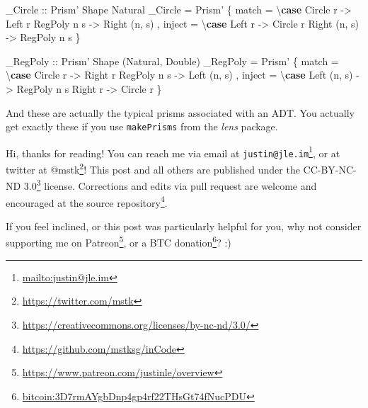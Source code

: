\documentclass[]{article}
\newenvironment{Shaded}{}{}
\newcommand{\DataTypeTok}[1]{\textcolor[rgb]{0.56,0.13,0.00}{#1}}
\newcommand{\FunctionTok}[1]{\textcolor[rgb]{0.02,0.16,0.49}{#1}}
\newcommand{\KeywordTok}[1]{\textcolor[rgb]{0.00,0.44,0.13}{\textbf{#1}}}
\newcommand{\NormalTok}[1]{#1}
\newcommand{\OtherTok}[1]{\textcolor[rgb]{0.00,0.44,0.13}{#1}}
\renewcommand{\href}[2]{#2\footnote{\url{#1}}}
\begin{document}
\begin{Shaded}
\begin{Highlighting}[]
\OtherTok{_Circle ::} \DataTypeTok{Prism'} \DataTypeTok{Shape} \DataTypeTok{Natural}
\NormalTok{_Circle }\FunctionTok{=} \DataTypeTok{Prism'}\NormalTok{ \{ match  }\FunctionTok{=}\NormalTok{ \textbackslash{}}\KeywordTok{case} \DataTypeTok{Circle}\NormalTok{  r    }\OtherTok{->} \DataTypeTok{Left}\NormalTok{ r}
                                  \DataTypeTok{RegPoly}\NormalTok{ n s  }\OtherTok{->} \DataTypeTok{Right}\NormalTok{ (n, s)}
\NormalTok{                 , inject }\FunctionTok{=}\NormalTok{ \textbackslash{}}\KeywordTok{case} \DataTypeTok{Left}\NormalTok{   r     }\OtherTok{->} \DataTypeTok{Circle}\NormalTok{ r}
                                  \DataTypeTok{Right}\NormalTok{ (n, s) }\OtherTok{->} \DataTypeTok{RegPoly}\NormalTok{ n s}
\NormalTok{                 \}}

\OtherTok{_RegPoly ::} \DataTypeTok{Prism'} \DataTypeTok{Shape}\NormalTok{ (}\DataTypeTok{Natural}\NormalTok{, }\DataTypeTok{Double}\NormalTok{)}
\NormalTok{_RegPoly }\FunctionTok{=} \DataTypeTok{Prism'}\NormalTok{ \{ match  }\FunctionTok{=}\NormalTok{ \textbackslash{}}\KeywordTok{case} \DataTypeTok{Circle}\NormalTok{  r    }\OtherTok{->} \DataTypeTok{Right}\NormalTok{ r}
                                   \DataTypeTok{RegPoly}\NormalTok{ n s  }\OtherTok{->} \DataTypeTok{Left}\NormalTok{ (n, s)}
\NormalTok{                  , inject }\FunctionTok{=}\NormalTok{ \textbackslash{}}\KeywordTok{case} \DataTypeTok{Left}\NormalTok{  (n, s) }\OtherTok{->} \DataTypeTok{RegPoly}\NormalTok{ n s}
                                   \DataTypeTok{Right}\NormalTok{  r     }\OtherTok{->} \DataTypeTok{Circle}\NormalTok{ r}
\NormalTok{                  \}}
\end{Highlighting}
\end{Shaded}

And these are actually the typical prisms associated with an ADT. You actually
get exactly these if you use \texttt{makePrisms} from the \emph{lens} package.

Hi, thanks for reading! You can reach me via email at
\href{mailto:justin@jle.im}{\nolinkurl{justin@jle.im}}, or at twitter at
\href{https://twitter.com/mstk}{@mstk}! This post and all others are published
under the \href{https://creativecommons.org/licenses/by-nc-nd/3.0/}{CC-BY-NC-ND
3.0} license. Corrections and edits via pull request are welcome and encouraged
at \href{https://github.com/mstksg/inCode}{the source repository}.

If you feel inclined, or this post was particularly helpful for you, why not
consider \href{https://www.patreon.com/justinle/overview}{supporting me on
Patreon}, or a \href{bitcoin:3D7rmAYgbDnp4gp4rf22THsGt74fNucPDU}{BTC donation}?
:)
\end{document}
